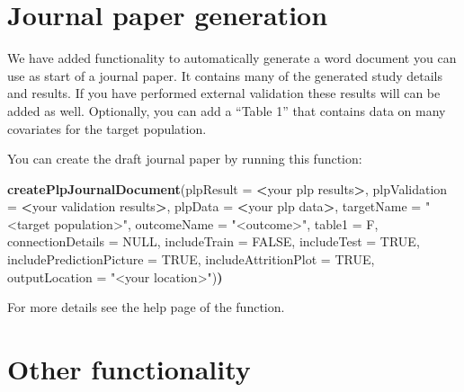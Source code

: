\documentclass[
]{article}
\newenvironment{Shaded}{\begin{snugshade}}{\end{snugshade}}
\newcommand{\DataTypeTok}[1]{\textcolor[rgb]{0.13,0.29,0.53}{#1}}
\newcommand{\ErrorTok}[1]{\textcolor[rgb]{0.64,0.00,0.00}{\textbf{#1}}}
\newcommand{\KeywordTok}[1]{\textcolor[rgb]{0.13,0.29,0.53}{\textbf{#1}}}
\newcommand{\NormalTok}[1]{#1}
\newcommand{\OperatorTok}[1]{\textcolor[rgb]{0.81,0.36,0.00}{\textbf{#1}}}
\newcommand{\OtherTok}[1]{\textcolor[rgb]{0.56,0.35,0.01}{#1}}
\newcommand{\StringTok}[1]{\textcolor[rgb]{0.31,0.60,0.02}{#1}}
\begin{document}
\hypertarget{journal-paper-generation}{%
\section{Journal paper generation}\label{journal-paper-generation}}

We have added functionality to automatically generate a word document
you can use as start of a journal paper. It contains many of the
generated study details and results. If you have performed external
validation these results will can be added as well. Optionally, you can
add a ``Table 1'' that contains data on many covariates for the target
population.

You can create the draft journal paper by running this function:

\begin{Shaded}
\begin{Highlighting}[]
\KeywordTok{createPlpJournalDocument}\NormalTok{(}\DataTypeTok{plpResult =} \OperatorTok{<}\NormalTok{your plp results}\OperatorTok{>}\NormalTok{, }
                         \DataTypeTok{plpValidation =} \OperatorTok{<}\NormalTok{your validation results}\OperatorTok{>}\NormalTok{,}
                         \DataTypeTok{plpData =} \OperatorTok{<}\NormalTok{your plp data}\OperatorTok{>}\NormalTok{, }
                         \DataTypeTok{targetName =} \StringTok{"<target population>"}\NormalTok{,}
                         \DataTypeTok{outcomeName =} \StringTok{"<outcome>"}\NormalTok{, }
                         \DataTypeTok{table1 =}\NormalTok{ F, }
                         \DataTypeTok{connectionDetails =} \OtherTok{NULL}\NormalTok{,}
                         \DataTypeTok{includeTrain =} \OtherTok{FALSE}\NormalTok{,}
                         \DataTypeTok{includeTest =} \OtherTok{TRUE}\NormalTok{,}
                         \DataTypeTok{includePredictionPicture =} \OtherTok{TRUE}\NormalTok{,}
                         \DataTypeTok{includeAttritionPlot =} \OtherTok{TRUE}\NormalTok{,}
                         \DataTypeTok{outputLocation =} \StringTok{"<your location>"}\NormalTok{)}\ErrorTok{)}
\end{Highlighting}
\end{Shaded}

For more details see the help page of the function.

\newpage

\hypertarget{other-functionality}{%
\section{Other functionality}\label{other-functionality}}
\end{document}
